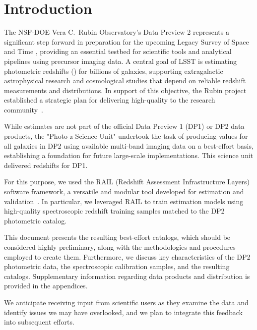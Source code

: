\section{Introduction}
\label{sec:intro:0}

The NSF-DOE Vera C.\ Rubin Observatory's Data Preview 2 \citep[DP2;][]{RTN-115,10.71929/rubin/3382528} represents a
significant step forward in preparation for the upcoming Legacy Survey
of Space and Time \citep[LSST;][]{2019ApJ...873..111I}, providing an essential testbed for
scientific tools and analytical pipelines using precursor imaging
data. A central goal of LSST is estimating photometric
redshifts (\photozs) for billions of galaxies, supporting
extragalactic astrophysical research and cosmological studies that
depend on reliable redshift measurements and distributions. In support
of this objective, the Rubin project established a strategic plan for
delivering high-quality \photozs  to the research
community~\citep{DMTN-049}.

While \photoz estimates are not part of the official Data Preview 1
(DP1) or DP2 data products, the "Photo-z Science Unit" undertook the
task of producing \photoz values for all galaxies in DP2 using
available multi-band imaging data on a best-effort basis, establishing
a foundation for future large-scale implementations.   This science
unit delivered redshifts for DP1\citep{SITCOMTN-154,2026AJ....171..360V}.

For this purpose, we used the RAIL (Redshift Assessment
Infrastructure Layers) software framework, a versatile and modular
tool developed for \photoz estimation and
validation~\citep{RAIL}. In particular, we leveraged RAIL to
train \photoz estimation models using high-quality spectroscopic
redshift training samples matched to the DP2 photometric catalog.

This document presents the resulting best-effort \photoz catalogs,
which should be considered highly preliminary, along with the
methodologies and procedures employed to create them. Furthermore, we
discuss key characteristics of the DP2 photometric data, the
spectroscopic calibration samples, and the resulting\photoz
catalogs. Supplementary information regarding data products and
distribution is provided in the appendices.

We anticipate receiving input from scientific users as they examine
the data and identify issues we may have overlooked, and we plan to
integrate this feedback into subsequent efforts.




